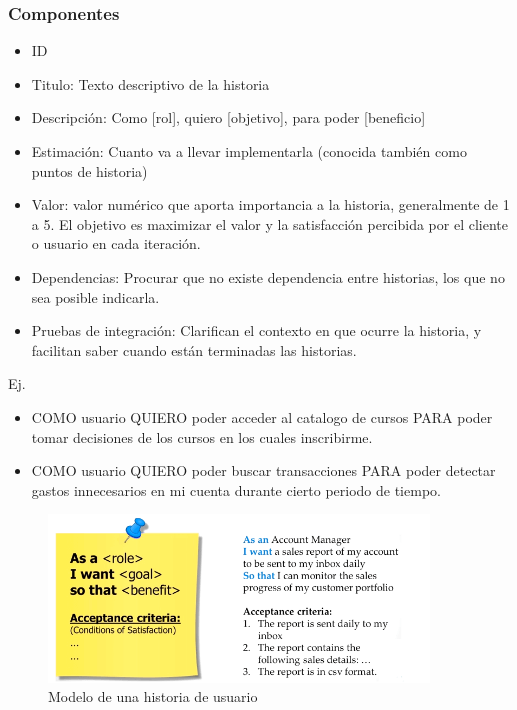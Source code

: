 \documentclass[titlepage,a4paper]{article}
\begin{document}
\subsubsection*{Componentes}
\begin{itemize}
    \item ID
    \item Titulo: Texto descriptivo de la historia
    \item Descripción: Como [rol], quiero [objetivo], para poder [beneficio]
    \item Estimación: Cuanto va a llevar implementarla (conocida también como puntos de historia)
    \item Valor: valor numérico que aporta importancia a la historia, generalmente de 1 a 5. El objetivo es maximizar el valor y la satisfacción percibida por el cliente o usuario en cada iteración.
    \item Dependencias: Procurar que no existe dependencia entre historias, los que no sea posible indicarla.
    \item Pruebas de integración: Clarifican el contexto en que ocurre la historia, y facilitan saber cuando están terminadas las historias.
\end{itemize}

Ej. 
\begin{itemize}
    \item COMO usuario QUIERO poder acceder al catalogo de cursos PARA poder tomar decisiones de los cursos en los cuales inscribirme.
    \item COMO usuario QUIERO poder buscar transacciones PARA poder detectar gastos innecesarios en mi cuenta durante cierto periodo de tiempo.
\end{itemize}

\begin{figure}[!htb]
    \centering
    \includegraphics[width=0.9\textwidth]{Imagenes/UserStory.png}
    \caption{Modelo de una historia de usuario}
\end{figure}
\end{document}
